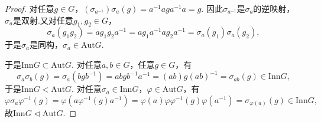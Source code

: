 \documentclass[12pt]{ctexart}
\theoremstyle{definition}
\theoremstyle{plain}
\newcommand{\Aut}{\mathrm{Aut}}
\newcommand{\Inn}{\mathrm{Inn}}
\begin{document}
	\begin{proof}
		对任意$g\in G$，$(\sigma_{a^{-1}})\sigma_a(g)=a^{-1}aga^{-1}a=g$. 因此$\sigma_{a^{-1}}$是$\sigma_a$的逆映射，$\sigma_a$是双射.又对任意$g_1,g_2\in G$，
		$$\sigma_a(g_1g_2)=ag_1g_2a^{-1}=ag_1a^{-1}ag_2a^{-1}=\sigma_a(g_1)\sigma_a(g_2),$$
		于是$\sigma_a$是同构，$\sigma_a\in\Aut G$.
		
		于是$\Inn G\subset\Aut G$. 对任意$a,b\in G$，任意$g\in G$，有
		$$\sigma_a\sigma_b(g)=\sigma_a(bgb^{-1})=abgb^{-1}a^{-1}=(ab)g(ab)^{-1}=\sigma_{ab}(g)\in\Inn G,$$
		于是$\Inn G<\Aut G$. 对任意$\sigma_a\in\Inn G$，$\varphi\in\Aut G$，有
		$$\varphi\sigma_a\varphi^{-1}(g)=\varphi(a\varphi^{-1}(g)a^{-1})=\varphi(a)\varphi\varphi^{-1}(g)\varphi(a^{-1})=\sigma_{\varphi(a)}(g)\in\Inn G,$$
		故$\Inn G\lhd\Aut G$.
	\end{proof}
\end{document}
